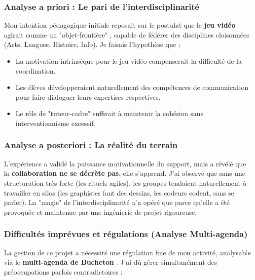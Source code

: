 \subsubsection{Analyse a priori : Le pari de l'interdisciplinarité}
Mon intention pédagogique initiale reposait sur le postulat que le \textbf{jeu vidéo} agirait comme un "objet-frontière" \parencite{star_griesemer_boundary_objects}, capable de fédérer des disciplines cloisonnées (Arts, Langues, Histoire, Info). Je faisais l'hypothèse que :
\begin{itemize}
    \item La motivation intrinsèque pour le jeu vidéo compenserait la difficulté de la coordination.
    \item Les élèves développeraient naturellement des compétences de communication pour faire dialoguer leurs expertises respectives.
    \item Le rôle de "tuteur-cadre" suffirait à maintenir la cohésion sans interventionnisme excessif.
\end{itemize}

\subsubsection{Analyse a posteriori : La réalité du terrain}
L'expérience a validé la puissance motivationnelle du support, mais a révélé que la \textbf{collaboration ne se décrète pas}, elle s'apprend. J'ai observé que sans une structuration très forte (les rituels agiles), les groupes tendaient naturellement à travailler en silos (les graphistes font des dessins, les codeurs codent, sans se parler). La "magie" de l'interdisciplinarité n'a opéré que parce qu'elle a été provoquée et maintenue par une ingénierie de projet rigoureuse.

\subsubsection{Difficultés imprévues et régulations (Analyse Multi-agenda)}
La gestion de ce projet a nécessité une régulation fine de mon activité, analysable via le \textbf{multi-agenda de Bucheton} \parencite{bucheton_postures}. J'ai dû gérer simultanément des préoccupations parfois contradictoires :

